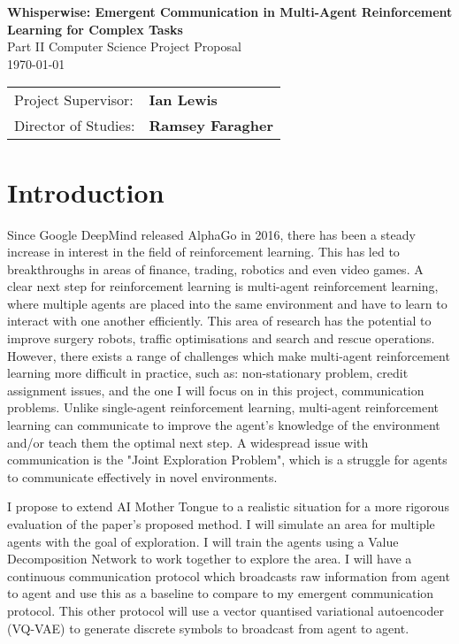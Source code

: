 \documentclass[20pt]{article}
\begin{document}
\begin{center}
  \Huge
  \textbf{Whisperwise: Emergent Communication in Multi-Agent Reinforcement Learning for Complex Tasks} \\[4mm]
  \Large
  Part II Computer Science Project Proposal \\[2mm]
  \today \\[8mm]
\end{center}

{\large
\begin{tabular}{ll}
  Project Supervisor:  & \bf Ian Lewis                \\
  Director of Studies: & \bf Ramsey Faragher                   \\
\end{tabular}
}



\section{Introduction}

\large
Since Google DeepMind released AlphaGo in 2016, there has been a steady increase in interest in the field of reinforcement learning. This has led to breakthroughs in areas of finance, trading, robotics and even video games. A clear next step for reinforcement learning is multi-agent reinforcement learning, where multiple agents are placed into the same environment and have to learn to interact with one another efficiently. This area of research has the potential to improve surgery robots, traffic optimisations and search and rescue operations. However, there exists a range of challenges which make multi-agent reinforcement learning more difficult in practice, such as: non-stationary problem, credit assignment issues, and the one I will focus on in this project, communication problems. Unlike single-agent reinforcement learning, multi-agent reinforcement learning can communicate to improve the agent's knowledge of the environment and/or teach them the optimal next step. A widespread issue with communication is the "Joint Exploration Problem", which is a struggle for agents to communicate effectively in novel environments.

I propose to extend AI Mother Tongue\cite{AiMotherTongue} to a realistic situation for a more rigorous evaluation of the paper's proposed method. I will simulate an area for multiple agents with the goal of exploration. I will train the agents using a Value Decomposition Network to work together to explore the area. I will have a continuous communication protocol which broadcasts raw information from agent to agent and use this as a baseline to compare to my emergent communication protocol. This other protocol will use a vector quantised variational autoencoder (VQ-VAE) to generate discrete symbols to broadcast from agent to agent.
\end{document}
